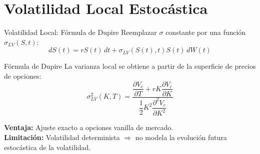 \documentclass[8pt]{beamer}
\begin{document}
\section{Volatilidad Local Estocástica}

\begin{frame}{Volatilidad Local: Fórmula de Dupire}
    Reemplazar $\sigma$ constante por una función $\sigma_{LV}(S,t)$:
    \[
        dS(t) = rS(t)\,dt + \sigma_{LV}(S(t),t)S(t)\,dW(t)
    \]
    \pause
    
    \begin{block}{Fórmula de Dupire}
        La varianza local se obtiene a partir de la superficie de precios de opciones:
        \[
            \sigma_{LV}^2(K,T) = \frac{\dfrac{\partial V_c}{\partial T} + rK\dfrac{\partial V_c}{\partial K}}{\dfrac{1}{2}K^2\dfrac{\partial^2 V_c}{\partial K^2}}
        \]
    \end{block}
    \pause
    
    \vspace{0.3cm}
    \textbf{Ventaja:} Ajuste exacto a opciones vanilla de mercado.\\[0.2cm]
    \textbf{Limitación:} Volatilidad determinista $\Longrightarrow$ no modela la evolución futura estocástica de la volatilidad.
\end{frame}
\end{document}
